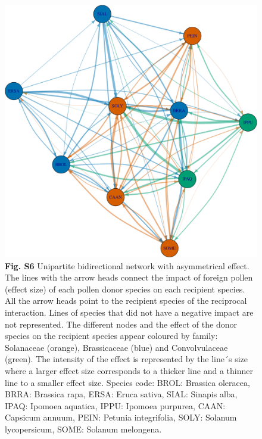 \documentclass[12pt,]{article}
\begin{document}
\begin{figure}
\centering
\includegraphics{Supp_Material_files/figure-latex/unnamed-chunk-15-1.pdf}
\caption{\textbf{Fig. S6} Unipartite bidirectional network with
asymmetrical effect. The lines with the arrow heads connect the impact
of foreign pollen (effect size) of each pollen donor species on each
recipient species. All the arrow heads point to the recipient species of
the reciprocal interaction. Lines of species that did not have a
negative impact are not represented. The different nodes and the effect
of the donor species on the recipient species appear coloured by family:
Solanaceae (orange), Brassicaceae (blue) and Convolvulaceae (green). The
intensity of the effect is represented by the line´s size where a larger
effect size corresponds to a thicker line and a thinner line to a
smaller effect size. Species code: BROL: Brassica oleracea, BRRA:
Brassica rapa, ERSA: Eruca sativa, SIAL: Sinapis alba, IPAQ: Ipomoea
aquatica, IPPU: Ipomoea purpurea, CAAN: Capsicum annuum, PEIN: Petunia
integrifolia, SOLY: Solanum lycopersicum, SOME: Solanum melongena.}
\end{figure}

\clearpage
\end{document}

